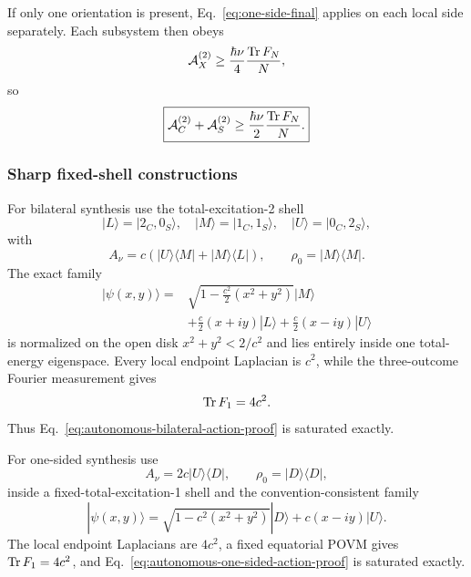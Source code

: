 If only one orientation is present, Eq.~\eqref{eq:one-side-final} applies on each local side separately. Each subsystem then obeys
\begin{equation}
\mathcal A_X^{(2)}
\ge\frac{\hbar\nu}{4}\frac{\operatorname{Tr} F_N}{N},
\end{equation}
so
\begin{equation}
\boxed{
\mathcal A_C^{(2)}+\mathcal A_S^{(2)}
\ge\frac{\hbar\nu}{2}\frac{\operatorname{Tr} F_N}{N}.
}
\label{eq:autonomous-one-sided-action-proof}
\end{equation}

\subsubsection{Sharp fixed-shell constructions}

For bilateral synthesis use the total-excitation-2 shell
\begin{equation}
|L\rangle=|2_C,0_S\rangle,
\quad
|M\rangle=|1_C,1_S\rangle,
\quad
|U\rangle=|0_C,2_S\rangle,
\end{equation}
with
\begin{equation}
A_\nu=c(|U\rangle\langle M|+|M\rangle\langle L|),
\qquad
\rho_0=|M\rangle\langle M|.
\end{equation}
The exact family
\begin{align}
|\psi(x,y)\rangle={}&
\sqrt{1-\frac{c^2}{2}(x^2+y^2)}|M\rangle\\
&+\frac c2(x+i y)|L\rangle
+\frac c2(x-i y)|U\rangle
\end{align}
is normalized on the open disk $x^2+y^2<2/c^2$ and lies entirely inside one total-energy eigenspace. Every local endpoint Laplacian is $c^2$, while the three-outcome Fourier measurement gives
\begin{equation}
\operatorname{Tr} F_1=4c^2.
\end{equation}
Thus Eq.~\eqref{eq:autonomous-bilateral-action-proof} is saturated exactly.

For one-sided synthesis use
\begin{equation}
A_\nu=2c|U\rangle\langle D|,
\qquad
\rho_0=|D\rangle\langle D|,
\end{equation}
inside a fixed-total-excitation-1 shell and the convention-consistent family
\begin{equation}
|\psi(x,y)\rangle
=\sqrt{1-c^2(x^2+y^2)}|D\rangle+c(x-i y)|U\rangle.
\end{equation}
The local endpoint Laplacians are $4c^2$, a fixed equatorial POVM gives $\operatorname{Tr} F_1=4c^2$, and Eq.~\eqref{eq:autonomous-one-sided-action-proof} is saturated exactly.
